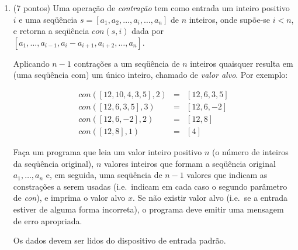 \documentclass{article}
\begin{document}
\begin{enumerate}
\begin{itemize}
     \item ``A representa\c{c}\~ao de $i$ n\~ao \'e um pal\'{\i}ndromo
     em nenhuma das bases de 2 a 16''.

  \end{itemize}

\item (7 pontos) Uma opera\c{c}\~ao de {\em contra\c{c}\~ao\/} tem
como entrada um inteiro positivo $i$ e uma seq\"u\^encia $s = [a_1,
a_2, \ldots, a_i, \ldots, a_n]$ de $n$ inteiros, onde sup\~oe-se $i <
n$, e retorna a seq\"u\^encia $con(s,i)$ dada por $[a_1, \ldots,
a_{i-1}, a_i-a_{i+1}, a_{i+2}, \ldots, a_n]$.

Aplicando $n-1$ contra\c{c}\~oes a um seq\"u\^encia de $n$ inteiros
quaisquer resulta em (uma seq\"u\^encia com) um \'unico inteiro,
chamado de {\em valor alvo\/}. Por exemplo:

  \[ \begin{array}{rcl}
       con([12,10,4,3,5],2) & = & [12,6,3,5] \\
       con([12,6,3,5],3)    & = & [12,6,-2]\\
       con([12,6,-2],2)     & = & [12,8]\\
       con([12,8],1)        & = & [4]
     \end{array}
  \]

Fa\c{c}a um programa que leia um valor inteiro positivo $n$ (o
n\'umero de inteiros da seq\"u\^encia original), $n$ valores inteiros
que formam a seq\"u\^encia original $a_1, \ldots, a_n$ e, em seguida,
uma seq\"u\^encia de $n-1$ valores que indicam as constra\c{c}\~oes a
serem usadas (i.e.~indicam em cada caso o segundo par\^ametro de {\it
con\/}), e imprima o valor alvo $x$. Se n\~ao existir valor alvo
(i.e.~se a entrada estiver de alguma forma incorreta), o programa deve
emitir uma mensagem de erro apropriada.

Os dados devem ser lidos do dispositivo de entrada padr\~ao.

\end{enumerate}
\end{document}

